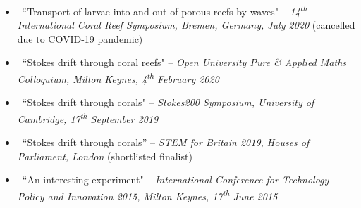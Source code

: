 \documentclass[a4paper]{article}
\begin{document}
\begin{multicols}{2}
\begin{small}
\begin{itemize}
                    \item \faVolumeUp \, ``Transport of larvae into and out of porous reefs by waves" -- \emph{14\textsuperscript{th} International Coral Reef Symposium, Bremen, Germany, July 2020} (cancelled due to COVID-19 pandemic)
                    \item \faVolumeUp \, ``Stokes drift through coral reefs" -- \emph{Open University Pure \& Applied Maths Colloquium, Milton Keynes, 4\textsuperscript{th} February 2020}
                    \item \faVolumeUp \, ``Stokes drift through corals" -- \emph{Stokes200 Symposium, University of Cambridge, 17\textsuperscript{th} September 2019}
                    \item \faClipboard \, ``Stokes drift through corals'' -- \emph{STEM for Britain 2019, Houses of Parliament, London} (shortlisted finalist)
                    \item \faVolumeUp \, ``An interesting experiment" -- \emph{International Conference for Technology Policy and Innovation 2015,  Milton Keynes, 17\textsuperscript{th} June 2015}
                \end{itemize}
            \end{small}
        
    \end{multicols}
\end{document}
